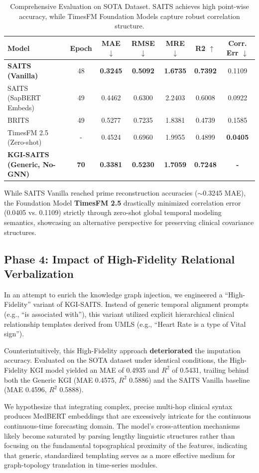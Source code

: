 \begin{table}[h]
\centering
\begin{tabular}{lcccccc}
\toprule
\textbf{Model} & \textbf{Epoch} & \textbf{MAE} $\downarrow$ & \textbf{RMSE} $\downarrow$ & \textbf{MRE} $\downarrow$ & \textbf{R2} $\uparrow$ & \textbf{Corr. Err} $\downarrow$ \\
\midrule
\textbf{SAITS (Vanilla)} & 48 & \textbf{0.3245} & \textbf{0.5092} & \textbf{1.6735} & \textbf{0.7392} & 0.1109 \\
SAITS (SapBERT Embeds) & 49 & 0.4462 & 0.6300 & 2.2403 & 0.6008 & 0.0922 \\
BRITS & 49 & 0.5277 & 0.7235 & 1.8381 & 0.4739 & 0.1585 \\
TimesFM 2.5 (Zero-shot) & - & 0.4524 & 0.6960 & 1.9955 & 0.4899 & \textbf{0.0405} \\
\midrule
\textbf{KGI-SAITS (Generic, No-GNN)} & \textbf{70} & \textbf{0.3381} & \textbf{0.5230} & \textbf{1.7059} & \textbf{0.7248} & \textbf{-} \\
\bottomrule
\end{tabular}
\caption{Comprehensive Evaluation on SOTA Dataset. SAITS achieves high point-wise accuracy, while TimesFM Foundation Models capture robust correlation structure.}
\label{tab:results_sota}
\end{table}

While SAITS Vanilla reached prime reconstruction accuracies ($\sim$0.3245 MAE), the Foundation Model \textbf{TimesFM 2.5} drastically minimized correlation error (0.0405 vs. 0.1109) strictly through zero-shot global temporal modeling semantics, showcasing an alternative perspective for preserving clinical covariance structures.

\subsection{Phase 4: Impact of High-Fidelity Relational Verbalization}
In an attempt to enrich the knowledge graph injection, we engineered a ``High-Fidelity'' variant of KGI-SAITS. Instead of generic temporal alignment prompts (e.g., ``is associated with''), this variant utilized explicit hierarchical clinical relationship templates derived from UMLS (e.g., ``Heart Rate is a type of Vital sign'').

Counterintuitively, this High-Fidelity approach \textbf{deteriorated} the imputation accuracy. Evaluated on the SOTA dataset under identical conditions, the High-Fidelity KGI model yielded an MAE of 0.4935 and $R^2$ of 0.5431, trailing behind both the Generic KGI (MAE 0.4575, $R^2$ 0.5886) and the SAITS Vanilla baseline (MAE 0.4596, $R^2$ 0.5888). 

We hypothesize that integrating complex, precise multi-hop clinical syntax produces MedBERT embeddings that are excessively intricate for the continuous continuous-time forecasting domain. The model's cross-attention mechanisms likely become saturated by parsing lengthy linguistic structures rather than focusing on the fundamental topographical proximity of the features, indicating that generic, standardized templating serves as a more effective medium for graph-topology translation in time-series modules.
